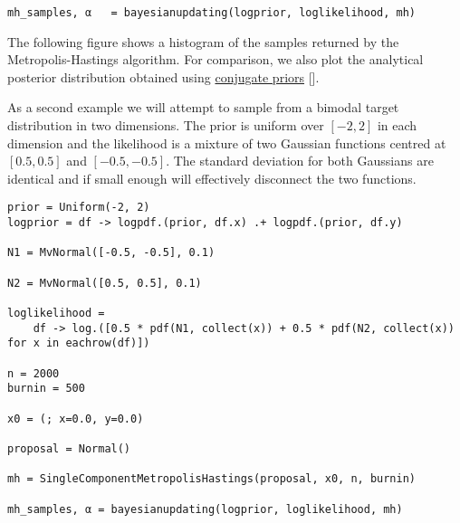 \begin{verbatim}
mh_samples, α   = bayesianupdating(logprior, loglikelihood, mh)
\end{verbatim}



The following figure shows a histogram of the samples returned by the Metropolis-Hastings algorithm. For comparison, we also plot the analytical posterior distribution obtained using \href{https://en.wikipedia.org/wiki/Conjugate\_prior}{conjugate priors} [].





\begin{figure}
\centering
\caption{}
\end{figure}




As a second example we will attempt to sample from a bimodal target distribution in two dimensions. The prior is uniform over \([-2, 2]\) in each dimension and the likelihood is a mixture of two Gaussian functions centred at \([0.5, 0.5]\) and \([-0.5, -0.5]\).  The standard deviation for both Gaussians are identical and if small enough will effectively disconnect the two functions.




\begin{verbatim}
prior = Uniform(-2, 2)
logprior = df -> logpdf.(prior, df.x) .+ logpdf.(prior, df.y)

N1 = MvNormal([-0.5, -0.5], 0.1)

N2 = MvNormal([0.5, 0.5], 0.1)

loglikelihood =
    df -> log.([0.5 * pdf(N1, collect(x)) + 0.5 * pdf(N2, collect(x)) for x in eachrow(df)])

n = 2000
burnin = 500

x0 = (; x=0.0, y=0.0)

proposal = Normal()

mh = SingleComponentMetropolisHastings(proposal, x0, n, burnin)

mh_samples, α = bayesianupdating(logprior, loglikelihood, mh)
\end{verbatim}



\begin{figure}
\centering
\caption{}
\end{figure}




